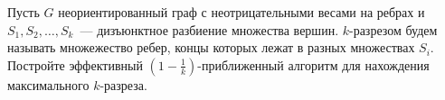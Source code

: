 Пусть $G$ неориентированный граф с неотрицательными весами на ребрах и $S_1, S_2, \dots, S_k$~---
дизъюнктное разбиение множества вершин. $k$-разрезом будем называть множежество ребер, концы которых
лежат в разных множествах $S_i$. Постройте эффективный $\left(1 - \frac{1}{k} \right)$-приближенный
алгоритм для нахождения максимального $k$-разреза.
